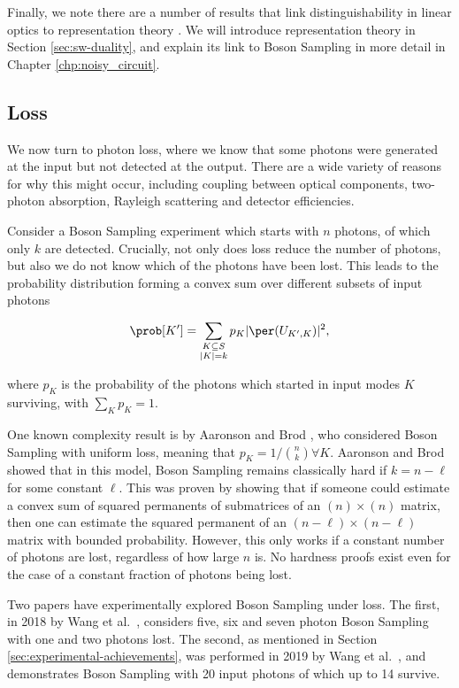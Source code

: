 Finally, we note there are a number of results that link distinguishability in linear optics to representation theory \cite{adamson2008, deguise2014, turner2016, menssen2017, stanisic2018}. We will introduce representation theory in Section \ref{sec:sw-duality}, and explain its link to Boson Sampling in more detail in Chapter \ref{chp:noisy_circuit}.

\subsection{Loss}
\label{ssec:imperfections-loss}

We now turn to photon loss, where we know that some photons were generated at the input but not detected at the output. There are a wide variety of reasons for why this might occur, including coupling between optical components, two-photon absorption, Rayleigh scattering and detector efficiencies.

Consider a Boson Sampling experiment which starts with $n$ photons, of which only $k$ are detected. Crucially, not only does loss reduce the number of photons, but also we do not know which of the photons have been lost. This leads to the probability distribution forming a convex sum over different subsets of input photons

\begin{equation}
\prob[K'] = \sum_{\substack{K \subseteq S\\|K| = k}}p_{K}|\per(U_{K',K})|^2,
\end{equation}

\noindent where $p_K$ is the probability of the photons which started in input modes $K$ surviving, with $\sum_Kp_K = 1$.

One known complexity result is by Aaronson and Brod \cite{aaronson2016}, who considered Boson Sampling with uniform loss, meaning that $p_K=1/\binom{n}{k}\forall K$. Aaronson and Brod showed that in this model, Boson Sampling remains classically hard if $k=n-\ell$ for some constant $\ell$. This was proven by showing that if someone could estimate a convex sum of squared permanents of submatrices of an $(n)\times(n)$ matrix, then one can estimate the squared permanent of an $(n-\ell)\times(n-\ell)$ matrix with bounded probability. However, this only works if a constant number of photons are lost, regardless of how large $n$ is. No hardness proofs exist even for the case of a constant fraction of photons being lost.

Two papers have experimentally explored Boson Sampling under loss. The first, in 2018 by Wang et al.~\cite{wang2018}, considers five, six and seven photon Boson Sampling with one and two photons lost. The second, as mentioned in Section \ref{sec:experimental-achievements}, was performed in 2019 by Wang et al.~\cite{wang2019}, and demonstrates Boson Sampling with 20 input photons of which up to 14 survive.

